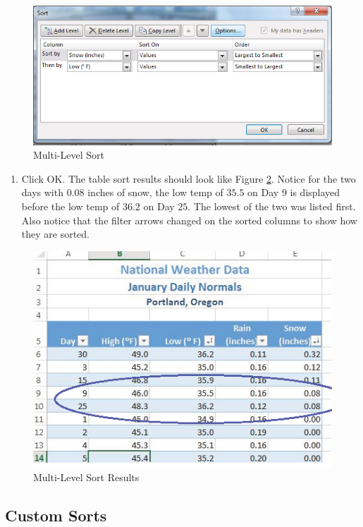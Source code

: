 \begin{figure}[H]
	\centering
	\includegraphics[width=\maxwidth{.95\linewidth}]{gfx/ch05_fig11}
	\caption{Multi-Level Sort}
	\label{05:fig11}
\end{figure}

\begin{enumerate}[resume]
	\item Click OK. The table sort results should look like Figure \ref{05:fig12}. Notice for the two days with $ 0.08 $ inches of snow, the low temp of $ 35.5 $ on Day $ 9 $ is displayed before the low temp of $ 36.2 $ on Day $ 25 $. The lowest of the two was listed first. Also notice that the filter arrows changed on the sorted columns to show how they are sorted.
\end{enumerate}

\begin{figure}[H]
	\centering
	\includegraphics[width=\maxwidth{.95\linewidth}]{gfx/ch05_fig12}
	\caption{Multi-Level Sort Results}
	\label{05:fig12}
\end{figure}

\subsection{Custom Sorts}

